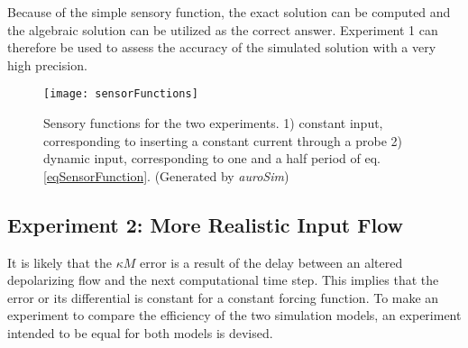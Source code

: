 	Because of the simple sensory function, the exact solution can be computed and the algebraic solution can be utilized as the correct answer.
	Experiment 1 can therefore be used to assess the accuracy of the simulated solution with a very high precision.


\begin{figure}[hbt!p]
	\centering
	\texttt{[image: sensorFunctions]}
	\caption[Sensory functions for the two efficiency experiments.]{
				Sensory functions for the two experiments. 1) constant input, corresponding to inserting a constant current through a probe 
				2) dynamic input, corresponding to one and a half period of eq. \eqref{eqSensorFunction}.
				(Generated by \emph{auroSim})	
			}
	\label{figSensorFunk}
\end{figure}

	\subsection{Experiment 2: More Realistic Input Flow}
	\label{ssecExperiment2Design}
	It is likely that the $\kappa M$ error is a result of the delay between an altered depolarizing flow and the next computational time step.
	This implies that the error or its differential is constant for a constant forcing function.
	To make an experiment to compare the efficiency of the two simulation models, an experiment intended to be equal for both models is devised.

 
